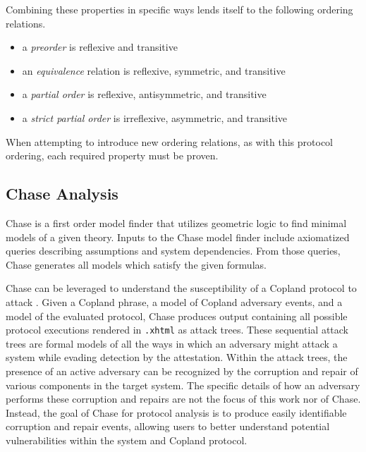 \documentclass[runningheads]{llncs}
\theoremstyle{definition}
\newcommand{\squash}{\itemsep=0pt\parskip=0pt}
\begin{document}
\noindent Combining these properties in specific ways lends itself to the following ordering relations.

\begin{itemize}
    \squash
    \item a \emph{preorder} is reflexive and transitive
    \item an \emph{equivalence} relation is reflexive, symmetric, and transitive 
    \item a \emph{partial order} is reflexive, antisymmetric, and transitive 
    \item a \emph{strict partial order} is irreflexive, asymmetric, and transitive 
\end{itemize}

\noindent When attempting to introduce new ordering relations, as with this protocol ordering, each required property must be proven.  

\subsection*{Chase Analysis}

Chase \cite{Ramsdell:2020:Chase,Rowe:2021:AutomatedTrust} is a first order model finder that utilizes geometric logic\cite{Enderton:logic} to find minimal models of a given theory. Inputs to the Chase model finder include axiomatized queries describing assumptions and system dependencies. From those queries, Chase generates all models which satisfy the given formulas. 


Chase can be leveraged to understand the susceptibility of a Copland protocol to attack \cite{Rowe:2021:AutomatedTrust}. Given a Copland phrase, a model of Copland adversary events, and a model of the evaluated protocol, Chase produces output containing all possible protocol executions rendered in \texttt{.xhtml} as attack trees. These sequential attack trees \cite{Horne:Attack, Jhaware:attack} are formal models of all the ways in which an adversary might attack a system while evading detection by the attestation. Within the attack trees, the presence of an active adversary can be recognized by the corruption and repair of various components in the target system. The specific details of how an adversary performs these corruption and repairs are not the focus of this work nor of Chase. Instead, the goal of Chase for protocol analysis is to produce easily identifiable corruption and repair events, allowing users to better understand potential vulnerabilities within the system and Copland protocol. 
\end{document}
